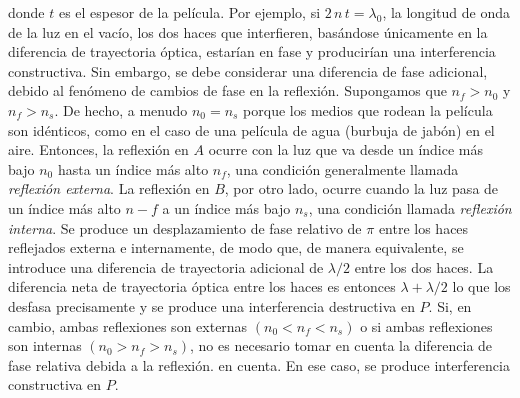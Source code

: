 \documentclass[14pt]{extarticle}
\begin{document}
donde $t$ es el espesor de la película. Por ejemplo, si $2 \, n  \, t = \lambda_{0}$, la longitud de onda de la luz en el vacío, los dos haces que interfieren, basándose únicamente en la diferencia de trayectoria óptica, estarían en fase y producirían una interferencia constructiva. Sin embargo, se debe considerar una diferencia de fase adicional, debido al fenómeno de cambios de fase en la reflexión. Supongamos que $n_{f} > n_{0}$ y $n_{f} > n_{s}$. De hecho, a menudo $n_{0} = n_{s}$ porque los medios que rodean la película son idénticos, como en el caso de una película de agua (burbuja de jabón) en el aire. Entonces, la reflexión en $A$ ocurre con la luz que va desde un índice más bajo $n_{0}$ hasta un índice más alto $n_{f}$, una condición generalmente llamada \textit{reflexión externa}. La reflexión en $B$, por otro lado, ocurre cuando la luz pasa de un índice más alto $n-{f}$ a un índice más bajo $n_{s}$, una condición llamada \textit{reflexión interna}. Se produce un desplazamiento de fase relativo de $\pi$ entre los haces reflejados externa e internamente, de modo que, de manera equivalente, se introduce una diferencia de trayectoria adicional de $\lambda/2$ entre los dos haces. La diferencia neta de trayectoria óptica entre los haces es entonces $\lambda + \lambda/2$ lo que los desfasa precisamente y se produce una interferencia destructiva en $P$. Si, en cambio, ambas reflexiones son externas $(n_{0} < n_{f} < n_{s})$ o si ambas reflexiones son internas $(n_{0} > n_{f} > n_{s})$, no es necesario tomar en cuenta la diferencia de fase relativa debida a la reflexión. en cuenta. En ese caso, se produce interferencia constructiva en $P$.
\par
\end{document}
